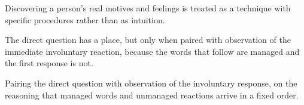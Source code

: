 

\begin{distilled}
  \item Discovering a person's real motives and feelings is treated as a technique with specific procedures rather than as intuition.
  \item The direct question has a place, but only when paired with observation of the immediate involuntary reaction, because the words that follow are managed and the first response is not.
\end{distilled}

\begin{unique}
  \item Pairing the direct question with observation of the involuntary response, on the reasoning that managed words and unmanaged reactions arrive in a fixed order.
\end{unique}
